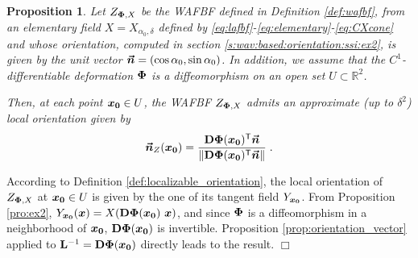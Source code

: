 \documentclass{elsarticle}
\newtheorem{proposition}{Proposition}
\newenvironment{proof}{\medskip\noindent{\bf Proof.}\;}{\null\hfill $\Box$\par\medskip }
\def\R{\mbox{$\mathbb{R}$}}
\begin{document}
\begin{proposition}\label{orientation_deformation}
Let $Z_{\mathbf{\Phi},X}$ be the WAFBF defined in Definition \ref{def:wafbf}, from an elementary field $X=X_{\alpha_0,\delta}$ defined by \eqref{eq:lafbf}-\eqref{eq:elementary}-\eqref{eq:CXcone} and whose orientation, computed in section \ref{s:wav:based:orientation:ssi:ex2}, is given by the unit vector $\bm{\vec n}=(\cos \alpha_0, \sin \alpha_0)$. In addition, we assume that the $C^1$-differentiable deformation ${\mathbf{\Phi}}$ is a diffeomorphism on an open set $U\subset \R^2$.

Then, at each point $\bm{x_0}\in U$,  the WAFBF $Z_{\mathbf{\Phi},X}$ admits an approximate (up to $\delta^2$) local orientation given by
\[
\bm{\vec n}_Z(\bm{x_0})=\frac{\mathbf{D}\mathbf{\Phi}(\bm{x_0})^{\mathsf{T}}\bm{\vec n}}{\|\mathbf{D}\mathbf{\Phi}(\bm{x_0})^{\mathsf{T}}\bm{\vec n}\|}\;.
\]
\end{proposition}
\begin{proof}
According to Definition \ref{def:localizable_orientation}, the local orientation of $Z_{\mathbf{\Phi},X}$ at $\bm{x_0}\in U$ is given by the one of its tangent field $Y_{\bm{x_0}}$. From Proposition \ref{pro:ex2}, $Y_{\bm{x_0}} (\bm{x})= X(\mathbf{D}\mathbf{\Phi}(\bm{x_0})~ \bm{x})$, and since ${\mathbf{\Phi}}$ is a diffeomorphism in a neighborhood  of $\bm{x_0}$, $\mathbf{D}\mathbf{\Phi}(\bm{x_0})$ is invertible. Proposition \ref{prop:orientation_vector} applied to $\mathbf{L}^{-1}=\mathbf{D}\mathbf{\Phi}(\bm{x_0})$ directly leads to the result.
\end{proof}

\end{document}
